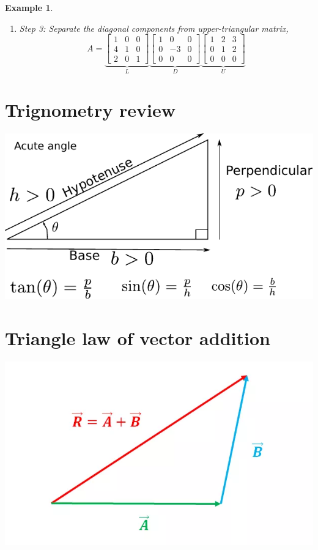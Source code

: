 \documentclass{article}
\newtheorem{example}{Example}
\begin{document}
\begin{example}
\begin{enumerate}
    \item  Step   3:  Separate  the diagonal components  from upper-triangular matrix,
    \[
      A   
      =   \underbrace{\begin{bmatrix}
        1 & 0  &  0 \\
        4  &  1 &  0  \\
        2  &  0 &  1
      \end{bmatrix}}_{L}
      \underbrace{\begin{bmatrix}
        1 & 0 &  0  \\
        0 & -3 &  0 \\
        0 & 0 &  0
      \end{bmatrix}}_{D}
      \underbrace{\begin{bmatrix}
        1 & 2 &  3  \\
        0 & 1 &  2 \\
        0 & 0 &  0
      \end{bmatrix}}_{U}
    \]
\end{enumerate}
\end{example}



\section{Trignometry review}
\includegraphics[width=\linewidth]{media/trig.pdf}

\section{Triangle law of vector addition}
\includegraphics[width=\linewidth]{media/triangle-law.png}
\end{document}
